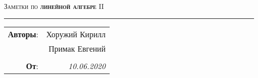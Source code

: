 

\begin{center}
    \LARGE \textsc{Заметки по \textbf{линейной алгебре} II}
\end{center}

\hrule

\phantom{42}

\begin{flushright}
    \begin{tabular}{rr}
        \textbf{Авторы}: 
        & Хоружий Кирилл \\
        & Примак Евгений \\
        &\\
        \textbf{От}: &
        \textit{10.06.2020}\\
    \end{tabular}
\end{flushright}


\thispagestyle{empty}
\tableofcontents
\newpage